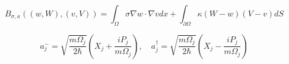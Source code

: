 \documentclass[12pt, a4paper, oneside]{ctexart}
\begin{document}
\begin{equation}
    B_{\sigma,\kappa}((w,W),(v,V)) = \int_{\Omega} \sigma \nabla w \cdot \nabla v dx + \int_{\partial\Omega} \kappa(W-w)(V-v) dS
\end{equation}

\begin{equation}
    a_j^- = \sqrt{\frac{m\Omega_j}{2\hbar}} \left( X_j + \frac{iP_j}{m\Omega_j} \right), \quad a_j^\dagger = \sqrt{\frac{m\Omega_j}{2\hbar}} \left( X_j - \frac{iP_j}{m\Omega_j} \right)
\end{equation}
\end{document}
